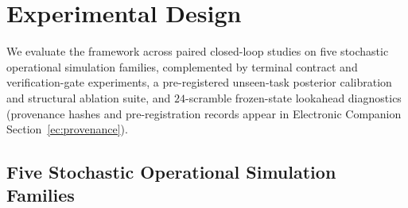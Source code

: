 \section{Experimental Design}\label{sec:experiments}

We evaluate the framework across paired closed-loop studies on five stochastic operational simulation families, complemented by terminal contract and verification-gate experiments, a pre-registered unseen-task posterior calibration and structural ablation suite, and $24$-scramble frozen-state lookahead diagnostics (provenance hashes and pre-registration records appear in Electronic Companion Section~\ref*{ec:provenance}).

\subsection{Five Stochastic Operational Simulation Families}

